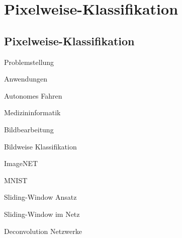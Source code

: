 \section{Pixelweise-Klassifikation}

\subsection*{Pixelweise-Klassifikation}

\begin{frame}{Problemstellung}

\end{frame}


\begin{frame}{Anwendungen}

\begin{minipage}{0.49\textwidth}
\begin{center}
Autonomes Fahren
\end{center}
\vspace{1cm}
\end{minipage}
\begin{minipage}{0.49\textwidth}
\begin{center}
Medizininformatik
\end{center}
\vspace{1cm}
\end{minipage}

\begin{center}
Bildbearbeitung
\end{center}



\end{frame}

\begin{frame}{Bildweise Klassifikation}

\begin{minipage}{0.49\textwidth}
\begin{center}
ImageNET
\end{center}
\vspace{1cm}
\end{minipage}
\begin{minipage}{0.49\textwidth}
\begin{center}
MNIST
\end{center}
\vspace{1cm}
\end{minipage}

\end{frame}

\begin{frame}{Sliding-Window Ansatz}

\end{frame}

\begin{frame}{Sliding-Window im Netz}

\end{frame}

\begin{frame}{Deconvolution Netzwerke}

\end{frame}